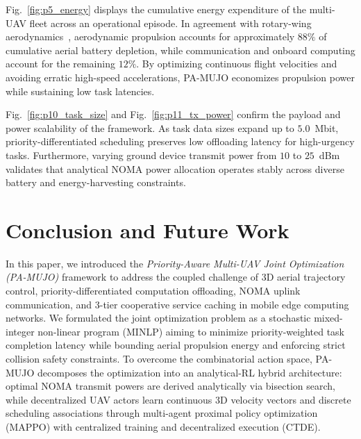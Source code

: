 \documentclass[journal]{IEEEtran}
\begin{document}
Fig.~\ref{fig:p5_energy} displays the cumulative energy expenditure of the multi-UAV fleet across an operational episode. In agreement with rotary-wing aerodynamics~\cite{8937764, li2026tnse}, aerodynamic propulsion accounts for approximately $88\%$ of cumulative aerial battery depletion, while communication and onboard computing account for the remaining $12\%$. By optimizing continuous flight velocities and avoiding erratic high-speed accelerations, PA-MUJO economizes propulsion power while sustaining low task latencies.

Fig.~\ref{fig:p10_task_size} and Fig.~\ref{fig:p11_tx_power} confirm the payload and power scalability of the framework. As task data sizes expand up to $5.0$~Mbit, priority-differentiated scheduling preserves low offloading latency for high-urgency tasks. Furthermore, varying ground device transmit power from $10$ to $25$~dBm validates that analytical NOMA power allocation operates stably across diverse battery and energy-harvesting constraints.


\section{Conclusion and Future Work}
\label{con}

In this paper, we introduced the \textit{Priority-Aware Multi-UAV Joint Optimization (PA-MUJO)} framework to address the coupled challenge of 3D aerial trajectory control, priority-differentiated computation offloading, NOMA uplink communication, and 3-tier cooperative service caching in mobile edge computing networks. We formulated the joint optimization problem as a stochastic mixed-integer non-linear program (MINLP) aiming to minimize priority-weighted task completion latency while bounding aerial propulsion energy and enforcing strict collision safety constraints. To overcome the combinatorial action space, PA-MUJO decomposes the optimization into an analytical-RL hybrid architecture: optimal NOMA transmit powers are derived analytically via bisection search, while decentralized UAV actors learn continuous 3D velocity vectors and discrete scheduling associations through multi-agent proximal policy optimization (MAPPO) with centralized training and decentralized execution (CTDE).
\end{document}
